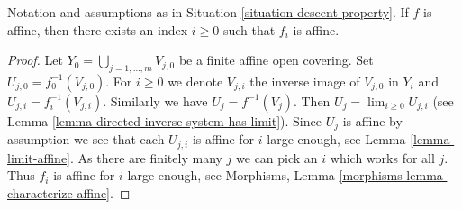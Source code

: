 \begin{lemma}
\label{lemma-descend-affine-finite-presentation}
Notation and assumptions as in Situation \ref{situation-descent-property}.
If $f$ is affine, then there exists an index $i \geq 0$
such that $f_i$ is affine.
\end{lemma}

\begin{proof}
Let $Y_0 = \bigcup_{j = 1, \ldots, m} V_{j, 0}$ be a finite affine
open covering. Set $U_{j, 0} = f_0^{-1}(V_{j, 0})$. For $i \geq 0$
we denote $V_{j, i}$ the inverse image of $V_{j, 0}$ in $Y_i$ and
$U_{j, i} = f_i^{-1}(V_{j, i})$. Similarly we have
$U_j = f^{-1}(V_j)$. Then $U_j = \lim_{i \geq 0} U_{j, i}$
(see Lemma \ref{lemma-directed-inverse-system-has-limit}).
Since $U_j$ is affine by assumption we see that
each $U_{j, i}$ is affine for $i$ large enough, see
Lemma \ref{lemma-limit-affine}. As there are finitely many $j$ we
can pick an $i$ which works for all $j$. Thus $f_i$ is
affine for $i$ large enough, see
Morphisms, Lemma \ref{morphisms-lemma-characterize-affine}.
\end{proof}
